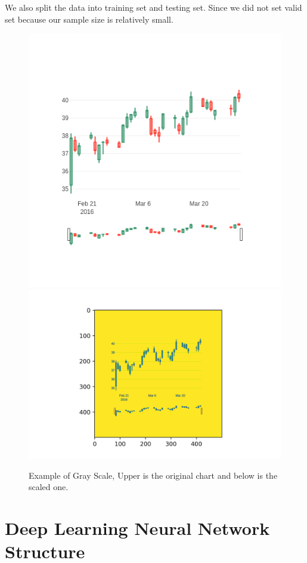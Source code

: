 \documentclass[12pt]{article}
\begin{document}
We also split the data into training set and testing set. Since we did not set valid set because our sample size is relatively small. 
\begin{figure}[h]
	\centering
	\includegraphics[scale=0.5]{iA}
	\includegraphics[scale=0.8]{iAgray}
	\caption{Example of Gray Scale, Upper is the original chart and below is the scaled one.}
	\label{fig:gray}
\end{figure}

\section{Deep Learning Neural Network Structure}
\end{document}
